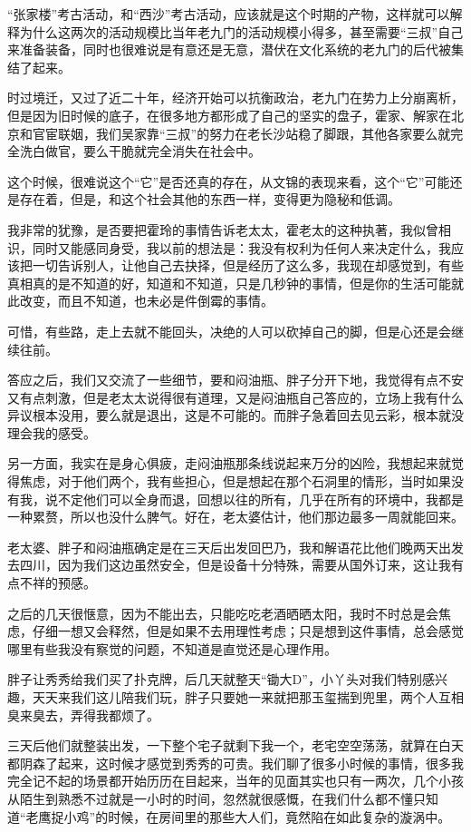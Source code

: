 “张家楼”考古活动，和“西沙”考古活动，应该就是这个时期的产物，这样就可以解释为什么这两次的活动规模比当年老九门的活动规模小得多，甚至需要“三叔”自己来准备装备，同时也很难说是有意还是无意，潜伏在文化系统的老九门的后代被集结了起来。

时过境迁，又过了近二十年，经济开始可以抗衡政治，老九门在势力上分崩离析，但是因为旧时候的底子，在很多地方都形成了自己的坚实的盘子，霍家、解家在北京和官宦联姻，我们吴家靠“三叔”的努力在老长沙站稳了脚跟，其他各家要么就完全洗白做官，要么干脆就完全消失在社会中。

这个时候，很难说这个“它”是否还真的存在，从文锦的表现来看，这个“它”可能还是存在着，但是，和这个社会其他的东西一样，变得更为隐秘和低调。

我非常的犹豫，是否要把霍玲的事情告诉老太太，霍老太的这种执著，我似曾相识，同时又能感同身受，我以前的想法是：我没有权利为任何人来决定什么，我应该把一切告诉别人，让他自己去抉择，但是经历了这么多，我现在却感觉到，有些真相真的是不知道的好，知道和不知道，只是几秒钟的事情，但是你的生活可能就此改变，而且不知道，也未必是件倒霉的事情。

可惜，有些路，走上去就不能回头，决绝的人可以砍掉自己的脚，但是心还是会继续往前。

答应之后，我们又交流了一些细节，要和闷油瓶、胖子分开下地，我觉得有点不安又有点刺激，但是老太太说得很有道理，又是闷油瓶自己答应的，立场上我有什么异议根本没用，要么就是退出，这是不可能的。而胖子急着回去见云彩，根本就没理会我的感受。

另一方面，我实在是身心俱疲，走闷油瓶那条线说起来万分的凶险，我想起来就觉得焦虑，对于他们两个，我有些担心，但是想起在那个石洞里的情形，当时如果没有我，说不定他们可以全身而退，回想以往的所有，几乎在所有的环境中，我都是一种累赘，所以也没什么脾气。好在，老太婆估计，他们那边最多一周就能回来。

老太婆、胖子和闷油瓶确定是在三天后出发回巴乃，我和解语花比他们晚两天出发去四川，因为我们这边虽然安全，但是设备十分特殊，需要从国外订来，这让我有点不祥的预感。

之后的几天很惬意，因为不能出去，只能吃吃老酒晒晒太阳，我时不时总是会焦虑，仔细一想又会释然，但是如果不去用理性考虑；只是想到这件事情，总会感觉哪里有些我没有察觉的问题，不知道是直觉还是心理作用。

胖子让秀秀给我们买了扑克牌，后几天就整天“锄大D”，小丫头对我们特别感兴趣，天天来我们这儿陪我们玩，胖子只要她一来就把那玉玺揣到兜里，两个人互相臭来臭去，弄得我都烦了。

三天后他们就整装出发，一下整个宅子就剩下我一个，老宅空空荡荡，就算在白天都阴森了起来，这时候才感觉到秀秀的可贵。我们聊了很多小时候的事情，很多我完全记不起的场景都开始历历在目起来，当年的见面其实也只有一两次，几个小孩从陌生到熟悉不过就是一小时的时间，忽然就很感慨，在我们什么都不懂只知道“老鹰捉小鸡”的时候，在房间里的那些大人们，竟然陷在如此复杂的漩涡中。

